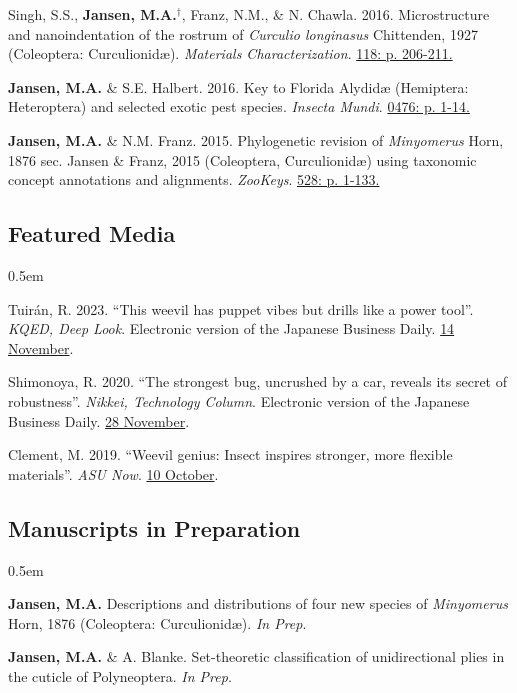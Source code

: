 \documentclass[12pt,a4paper]{article}
\begin{document}
\begin{description}
	\item Singh, S.S., \textbf{Jansen, M.A.}$^\dagger$, Franz, N.M., \& N. Chawla. 2016. Microstructure and nanoindentation of the rostrum of \textit{Curculio longinasus} Chittenden, 1927 (Coleoptera: Curculionid\ae). \textit{Materials Characterization}. \href{http://www.sciencedirect.com/science/article/pii/S1044580316301619}{118: p. 206-211.}
	
	\item \textbf{Jansen, M.A.} \& S.E. Halbert. 2016. Key to Florida Alydid{\ae} (Hemiptera: Heteroptera) and selected exotic pest species. \textit{Insecta Mundi}. \href{http://journals.fcla.edu/mundi/article/view/87952/84644}{0476: p. 1-14.}
	
	\item \textbf{Jansen, M.A.} \& N.M. Franz. 2015. Phylogenetic revision of \textit{Minyomerus} Horn, 1876 sec. Jansen \& Franz, 2015 (Coleoptera, Curculionid\ae) using taxonomic concept annotations and alignments. \textit{ZooKeys}. \href{http://zookeys.pensoft.net/articles.php?id=6001}{528: p. 1-133.}
\end{description}

\subsection*{Featured Media}
\begin{description}
	\itemsep0.5em
	\item Tuir\'{a}n, R. 2023. ``This weevil has puppet vibes but drills like a power tool''. \textit{KQED, Deep Look}. Electronic version of the Japanese Business Daily. \href{https://www.kqed.org/science/1985068/this-weevil-has-puppet-vibes-but-drills-like-a-power-tool}{14 November}.
	\item Shimonoya, R. 2020. ``The strongest bug, uncrushed by a car, reveals its secret of robustness''. \textit{Nikkei, Technology Column}. Electronic version of the Japanese Business Daily. \href{https://www.nikkei.com/article/DGXMZO66746060X21C20A1MY1000/}{28 November}.
	\item Clement, M. 2019. ``Weevil genius: Insect inspires stronger, more flexible materials''. \textit{ASU Now}. \href{https://asunow.asu.edu/20191010-discoveries-asu-engineering-weevil-inspires-stronger-flexible-materials}{10 October}.
	
\end{description}

\subsection*{Manuscripts in Preparation}
\begin{description}
	\itemsep0.5em
	\item \textbf{Jansen, M.A.} Descriptions and distributions of four new species of \textit{Minyomerus} Horn, 1876 (Coleoptera: Curculionid\ae). \textit{In Prep}.
	\item \textbf{Jansen, M.A.} \& A. Blanke. Set-theoretic classification of unidirectional plies in the cuticle of Polyneoptera. \textit{In Prep}.
\end{description}
\end{document}
